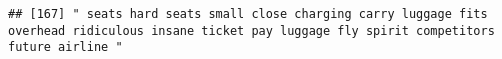 \documentclass[
]{article}
\begin{document}
\begin{verbatim}
## [167] " seats hard seats small close charging carry luggage fits overhead ridiculous insane ticket pay luggage fly spirit competitors future airline "                                                                                                                                                                                                                                                                                                                                                                                                                                                                                                                                                                                                                                                                                                                                                                                                                                                                                                                                                                                                                                                                                                                                                                                                                                                                                                                                                                                                                                                                                                                                                                                                                                                

\end{verbatim}
\end{document}
